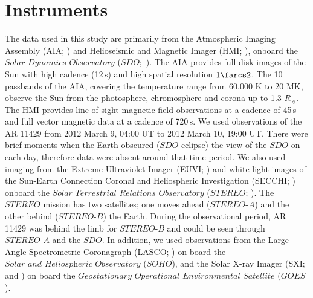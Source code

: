 \documentclass{aastex62}
\begin{document}
\section{\textbf{Instruments}}
\label{instru}
The data used in this study are primarily from the Atmospheric Imaging Assembly (AIA; \citealt{Lemen_etal_2012}) and Helioseismic and Magnetic Imager (HMI; \citealt{Schou_etal_2012}), onboard the $\textit{Solar Dynamics Observatory}$ ($\textit{SDO}$;~\citealt{Pesnell_etal_2012}). The AIA provides full disk images of the Sun with high cadence (12\,s) and high spatial resolution $1\farcs2$. The 10 passbands of the AIA, covering the temperature range from 60,000 K to 20 MK, observe the Sun from the photosphere, chromosphere and corona up to 1.3 $R_{\sun}$. The HMI provides line-of-sight magnetic field observations at a cadence of 45\,s and full vector magnetic data at a cadence of 720\,s. We used observations of the AR 11429 from 2012 March 9,  04:00 UT to 2012 March 10, 19:00 UT. There were brief moments when the Earth obscured ($\textit{SDO}$ eclipse) the view of the $\textit{SDO}$ on each day, therefore data were absent around that time period. We also used imaging from the Extreme Ultraviolet Imager (EUVI; \citet{Wuelser_etal_2004}) and white light images of the Sun-Earth Connection Coronal and Heliospheric Investigation (SECCHI; \citealt{Howard_etal_2008}) onboard the $\textit{Solar Terrestrial Relations Observatory}$ ($\textit{STEREO}$; \citet{Kaiser_etal_2008}). The $\textit{STEREO}$ mission has two satellites; one moves ahead ($\textit{STEREO-A}$) and the other behind ($\textit{STEREO-B}$) the Earth. During the observational period, AR 11429 was behind the limb for $\textit{STEREO-B}$ and could be seen through $\textit{STEREO-A}$ and the $\textit{SDO}$. In addition, we used observations from the Large Angle Spectrometric Coronagraph (LASCO; \citealt{Brueckner_etal_1995}) on board the $\textit{Solar and Heliospheric Observatory}$ ($\textit{SOHO}$), and the Solar X-ray Imager (SXI;~\citealt{Hill_etal_2005} and \citealt{Pizzo_etal_2005}) on board the $\textit{Geostationary Operational Environmental Satellite}$ ($\textit{GOES}$).
\end{document}
